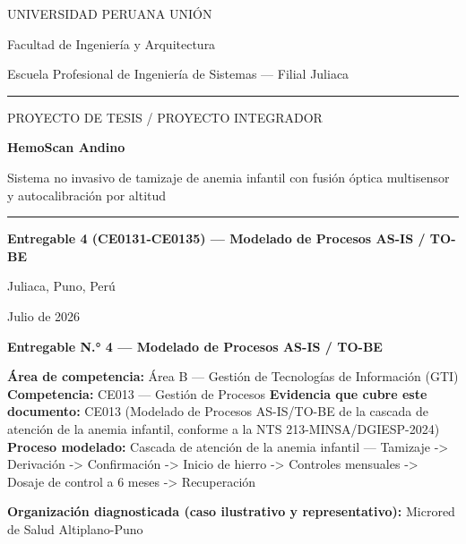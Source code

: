 \documentclass[11pt,a4paper]{article}
\begin{document}
\begin{titlepage}
\centering
\vspace*{1.2cm}
{\large UNIVERSIDAD PERUANA UNI\'ON\par}
{\normalsize Facultad de Ingenier\'ia y Arquitectura\par}
{\normalsize Escuela Profesional de Ingenier\'ia de Sistemas --- Filial Juliaca\par}
\vspace{0.5cm}
\rule{0.6\linewidth}{0.4pt}
\vspace{1.6cm}

{\large PROYECTO DE TESIS / PROYECTO INTEGRADOR\par}
\vspace{1.0cm}
{\huge\bfseries HemoScan Andino\par}
\vspace{0.6cm}
{\Large Sistema no invasivo de tamizaje de anemia infantil con fusi\'on \'optica multisensor y autocalibraci\'on por altitud\par}
\vspace{1.6cm}
\rule{0.6\linewidth}{0.4pt}
\vspace{1.6cm}

{\Large\bfseries Entregable 4 (CE0131-CE0135) --- Modelado de Procesos AS-IS / TO-BE\par}
\vspace{2.0cm}

{\normalsize Juliaca, Puno, Per\'u \par}
{\normalsize Julio de 2026\par}

\vfill
\end{titlepage}

\tableofcontents
\newpage

\textbf{Entregable N.° 4 --- Modelado de Procesos AS-IS / TO-BE}

\textbf{Área de competencia:} Área B --- Gestión de Tecnologías de Información (GTI)
\textbf{Competencia:} CE013 --- Gestión de Procesos
\textbf{Evidencia que cubre este documento:} CE013 (Modelado de Procesos AS-IS/TO-BE de la cascada de atención de la anemia infantil, conforme a la NTS 213-MINSA/DGIESP-2024)
\textbf{Proceso modelado:} Cascada de atención de la anemia infantil --- Tamizaje -\textgreater{} Derivación -\textgreater{} Confirmación -\textgreater{} Inicio de hierro -\textgreater{} Controles mensuales -\textgreater{} Dosaje de control a 6 meses -\textgreater{} Recuperación

\textbf{Organización diagnosticada (caso ilustrativo y representativo):} Microred de Salud Altiplano-Puno
\end{document}
